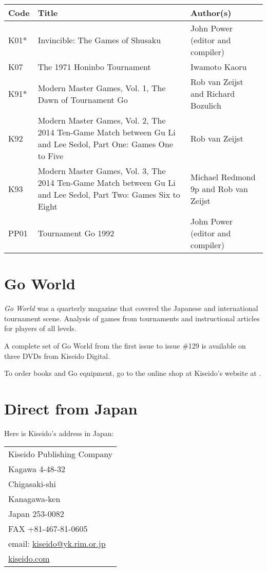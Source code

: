 \begin{longtable}{l|p{45mm}|p{25mm}} 
    \hline
    \textbf{Code} & \textbf{Title} & \textbf{Author(s)} \\
    \hline \hline
    K01* & Invincible: The Games of Shusaku & John Power (editor and compiler) \\
    \hline
    K07 & The 1971 Honinbo Tournament & Iwamoto Kaoru \\
    \hline
    K91* & Modern Master Games, Vol. 1, The Dawn of Tournament Go & Rob van Zeijst and Richard Bozulich \\
    \hline
    K92 & Modern Master Games, Vol. 2, The 2014 Ten-Game Match between Gu Li and Lee Sedol, Part One: Games One to Five & Rob van Zeijst \\
    \hline
    K93 & Modern Master Games, Vol. 3, The 2014 Ten-Game Match between Gu Li and Lee Sedol, Part Two: Games Six to Eight & Michael Redmond 9p and Rob van Zeijst \\
    \hline
    PP01 & Tournament Go 1992 & John Power (editor and compiler) \\
    \hline
\end{longtable}

\section{Go World}

\emph{Go World} was a quarterly magazine that covered the Japanese and international tournament scene. Analysis of games from tournaments and instructional articles for players of all levels.

A complete set of Go World from the first issue to issue \#129 is available on three DVDs from Kiseido Digital.

To order books and Go equipment, go to the online shop at Kiseido's website at \href{https://www.kiseido.com}{}.

\section{Direct from Japan}

Here is Kiseido's address in Japan:

\bigskip
\medskip

\begin{tabular}{l}
    \hline
    Kiseido Publishing Company \\
    Kagawa 4-48-32 \\
    Chigasaki-shi \\
    Kanagawa-ken \\
    Japan 253-0082 \\
    FAX +81-467-81-0605 \\
    email: \href{mailto:kiseido@yk.rim.or.jp}{kiseido@yk.rim.or.jp} \\
    \href{https://www.kiseido.com}{kiseido.com} \\
    \hline
\end{tabular}